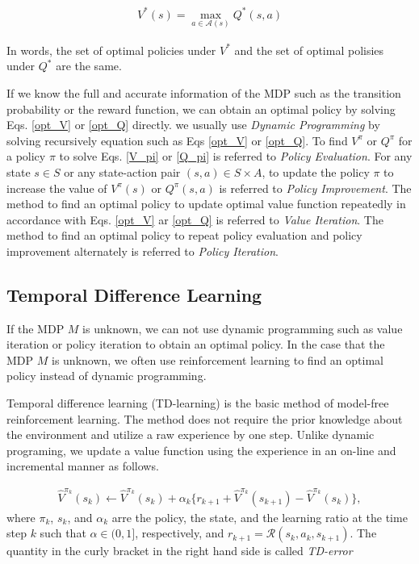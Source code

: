 \begin{align*}
  V^{\ast}(s) = \max_{a \in \mathcal{A}(s)} Q^{\ast}(s,a)
\end{align*}

In words, the set of optimal policies under $V^{\ast}$ and the set of optimal polisies under $Q^{\ast}$ are the same.

If we know the full and accurate information of the MDP such as the transition probability or the reward function, we can obtain an optimal policy by solving Eqs. \ref{opt_V} or \ref{opt_Q} directly. we usually use {\it Dynamic Programming} by solving recursively equation such as Eqs \ref{opt_V} or \ref{opt_Q}. To find $V^{\pi}$ or $Q^{\pi}$ for a policy $\pi$ to solve Eqs. \ref{V_pi} or \ref{Q_pi} is referred to {\it Policy Evaluation}. For any state $s \in S$ or any state-action pair $(s,a) \in S \times A$, to update the policy $\pi$ to increase the value of $V^{\pi}(s)$ or $Q^{\pi}(s,a)$ is referred to {\it Policy Improvement}. The method to find an optimal policy to update optimal value function repeatedly in accordance with Eqs. \ref{opt_V} ar \ref{opt_Q} is referred to {\it Value Iteration}. The method to find an optimal policy to repeat policy evaluation and policy improvement alternately is referred to {\it Policy Iteration}.

\subsection{Temporal Difference Learning}

If the MDP $M$ is unknown, we can not use dynamic programming such as value iteration or policy iteration to obtain an optimal policy. In the case that the MDP $M$ is unknown, we often use   reinforcement learning to find an optimal policy instead of dynamic programming.

Temporal difference learning (TD-learning) is the basic method of model-free reinforcement learning. The method does not require the prior knowledge about the environment and utilize a raw experience by one step. Unlike dynamic programing, we update a value function using the experience in an on-line and incremental manner as follows.

\begin{align}
  \hat{V}^{\pi_k}(s_k) \leftarrow \hat{V}^{\pi_k}(s_k) + \alpha_k \{ r_{k+1} + \hat{V}^{\pi_k}(s_{k+1}) - \hat{V}^{\pi_k}(s_k) \},
\end{align}
where $\pi_k$, $s_k$, and $\alpha_k$ arre the policy, the state, and the learning ratio at the time step $k$ such that $\alpha \in (0,1]$, respectively, and $r_{k+1} = \mathcal{R}(s_k, a_k, s_{k+1})$. The quantity in the curly bracket in the right hand side is called {\it TD-error}

